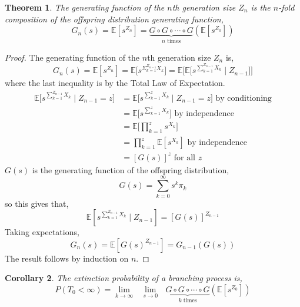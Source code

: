 \documentclass{tufte-handout}
\newtheorem{thm}{Theorem}
\newtheorem{cor}[thm]{Corollary}
\begin{document}
\begin{thm}
  The generating function of the $n$th generation size $Z_n$ is the $n$-fold composition of the offspring distribution generating function,
  \[G_{n}(s)= \mathbb{E}[s^{Z_n}] = \underbrace{G \circ G \circ \cdots \circ G}_{n \text{ times}}(\mathbb{E}[s^{Z_{0}}])\]
\end{thm}

\begin{proof}
  The generating function of the $n$th generation size $Z_n$ is,
  \[G_{n}(s)=\mathbb{E}[s^{Z_{n}}]=\mathbb{E}\bigg[s^{\Sigma_{k=1}^{Z_{n-1}} X_{k}}\bigg]=\mathbb{E}\bigg[\mathbb{E}\bigg[s^{\sum_{k=1}^{Z_{n-1}} X_{k}} \mid Z_{n-1}\bigg]\bigg]\]
  \noindent where the last inequality is by the Total Law of Expectation.
  \begin{align*}
    \mathbb{E}\bigg[s^{\sum_{k=1}^{Z_{n-1}} X_{k}} \mid Z_{n-1} = z\bigg]
    &= \mathbb{E}\bigg[s^{\sum_{k=1}^z X_{k}} \mid Z_{n-1} = z\bigg] \text{ by conditioning} \\
    &= \mathbb{E}\bigg[s^{\sum_{k=1}^z X_{k}}\bigg] \text{ by independence}\\
    &= \mathbb{E}\bigg[\prod_{k=1}^z s^{X_{k}}\bigg] \\
    &= \prod_{k=1}^z \mathbb{E}[s^{X_{k}}] \text{ by independence} \\
    &= [G(s)]^z \text{ for all $z$}
  \end{align*}
  \noindent $G(s)$ is the generating function of the offspring distribution,
  \[G(s) = \sum_{k=0}^{\infty} s^{k} \pi_k\]
  \noindent so this gives that,
  \[\mathbb{E}[s^{\sum_{k=1}^{Z_{n-1}}X_{k}} \mid Z_{n-1}]=[G(s)]^{Z_{n-1}}\]
  \noindent Taking expectations,
  \[G_{n}(s)=\mathbb{E}[G(s)^{Z_{n-1}}]=G_{n-1}(G(s))\]
  \noindent The result follows by induction on $n$.
\end{proof}

\begin{cor}
  The extinction probability of a branching process is,
  \[P(T_0 < \infty) = \lim_{k \rightarrow \infty} \text{ } \lim_{s \rightarrow 0} \text{ } \underbrace{G \circ G \circ \cdots \circ G}_{k \text{ times}}(\mathbb{E}[s^{Z_{0}}])\]
\end{cor}
\end{document}
